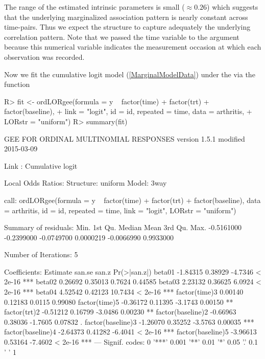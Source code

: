 \documentclass[article,shortnames,nojss]{jss}
\begin{document}
The range of the estimated intrinsic parameters is small ($\approx 0.26$) which suggests that the underlying marginalized association pattern is nearly constant across time-pairs. Thus we expect the  structure to capture adequately the underlying correlation pattern. Note that we passed the time variable to the  argument because this numerical variable indicates the measurement occasion at which each observation was recorded.

Now we fit the cumulative logit model (\ref{MarginalModelData}) under the  via the function  
\begin{Schunk}
\begin{Sinput}
R>  fit <- ordLORgee(formula = y ~ factor(time) + factor(trt) + factor(baseline),
+           link = "logit", id = id, repeated = time, data = arthritis,
+           LORstr = "uniform")
R>  summary(fit)
\end{Sinput}
\begin{Soutput}
GEE FOR ORDINAL MULTINOMIAL RESPONSES 
version 1.5.1 modified 2015-03-09 

Link : Cumulative logit 

Local Odds Ratios:
Structure:         uniform
Model:             3way

call:
ordLORgee(formula = y ~ factor(time) + factor(trt) + factor(baseline), 
    data = arthritis, id = id, repeated = time, link = "logit", 
    LORstr = "uniform")

Summary of residuals:
      Min.    1st Qu.     Median       Mean    3rd Qu.       Max. 
-0.5161000 -0.2399000 -0.0749700  0.0000219 -0.0066990  0.9933000 

Number of Iterations: 5 

Coefficients:
                  Estimate   san.se   san.z Pr(>|san.z|)    
beta01            -1.84315  0.38929 -4.7346      < 2e-16 ***
beta02             0.26692  0.35013  0.7624      0.44585    
beta03             2.23132  0.36625  6.0924      < 2e-16 ***
beta04             4.52542  0.42123 10.7434      < 2e-16 ***
factor(time)3      0.00140  0.12183  0.0115      0.99080    
factor(time)5     -0.36172  0.11395 -3.1743      0.00150 ** 
factor(trt)2      -0.51212  0.16799 -3.0486      0.00230 ** 
factor(baseline)2 -0.66963  0.38036 -1.7605      0.07832 .  
factor(baseline)3 -1.26070  0.35252 -3.5763      0.00035 ***
factor(baseline)4 -2.64373  0.41282 -6.4041      < 2e-16 ***
factor(baseline)5 -3.96613  0.53164 -7.4602      < 2e-16 ***
---
Signif. codes:  0 '***' 0.001 '**' 0.01 '*' 0.05 '.' 0.1 ' ' 1


\end{Soutput}
\end{Schunk}
\end{document}
